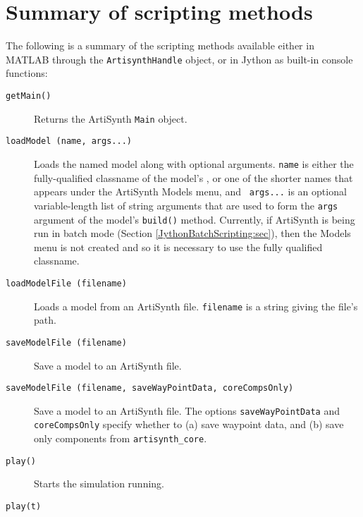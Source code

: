 \documentclass{article}
\begin{document}
\section{Summary of scripting methods}
\label{ScriptingMethods:sec}

The following is a summary of the scripting methods available
either in MATLAB through the {\tt ArtisynthHandle} object,
or in Jython as built-in console functions:

\begin{description}

\item[{\tt getMain()}] \mbox{}

Returns the ArtiSynth {\tt Main} object.

\item[{\tt loadModel (name, args...)}] \mbox{}

Loads the named model along with optional arguments.  {\tt name} is
either the fully-qualified classname of the model's
, or one of the shorter
names that appears under the ArtiSynth {\sf Models} menu, and {\tt
args...} is an optional variable-length list of string arguments that
are used to form the {\tt args} argument of the model's {\tt build()}
method. Currently, if ArtiSynth is being run in batch mode (Section
\ref{JythonBatchScripting:sec}), then the {\sf Models} menu is not
created and so it is necessary to use the fully qualified classname.

\item[{\tt loadModelFile (filename)}] \mbox{}

Loads a model from an ArtiSynth file. {\tt filename} is a string
giving the file's path.

\item[{\tt saveModelFile (filename)}] \mbox{}

Save a model to an ArtiSynth file.

\item[{\tt saveModelFile (filename, saveWayPointData, coreCompsOnly)}] \mbox{}

Save a model to an ArtiSynth file. The options {\tt saveWayPointData}
and {\tt coreCompsOnly} specify whether to (a) save waypoint data, and
(b) save only components from {\tt artisynth\_core}.

\item[{\tt play()}] \mbox{}

Starts the simulation running.

\item[{\tt play(t)}] \mbox{}


\end{description}
\end{document}
